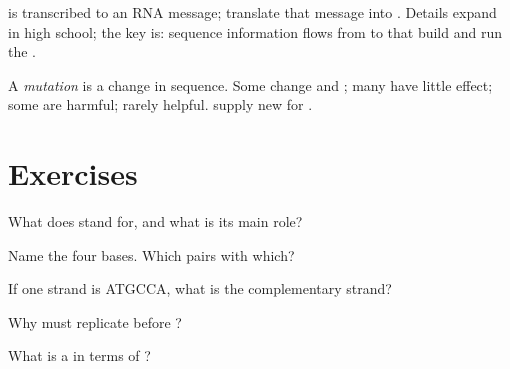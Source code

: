 \begin{proposition}\label{prop:g9:dna:central}
 is transcribed to an RNA message;  translate that message
into . Details expand in high school; the key is: sequence
information flows from  to  that build and run the .
\end{proposition}
\admitted

\begin{example}[Mutation]\label{ex:g9:dna:mut}
A \emph{mutation} is a change in  sequence. Some change
 and ; many have little effect; some are harmful; rarely
helpful.  supply new  for .
\end{example}

\section{Exercises}

\begin{exercise}[$\star$]\label{exo:g9:dna:1}
What does  stand for, and what is its main role?
\end{exercise}

\begin{exercise}[$\star$]\label{exo:g9:dna:2}
Name the four bases. Which pairs with which?
\end{exercise}

\begin{exercise}[$\star$]\label{exo:g9:dna:3}
If one strand is ATGCCA, what is the complementary strand?
\end{exercise}

\begin{exercise}[$\star$]\label{exo:g9:dna:4}
Why must  replicate before ?
\end{exercise}

\begin{exercise}[$\star$]\label{exo:g9:dna:5}
What is a  in terms of ?
\end{exercise}

